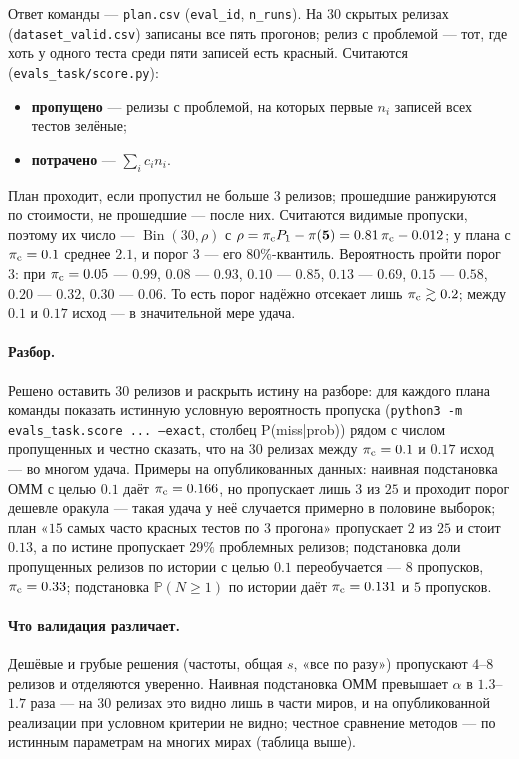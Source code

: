\documentclass[11pt,a4paper]{article}
\newcommand{\Prob}{\mathbb{P}}
\newcommand{\Bin}{\operatorname{Bin}}
\theoremstyle{plain}
\theoremstyle{definition}
\begin{document}
Ответ команды --- \texttt{plan.csv} (\texttt{eval\_id}, \texttt{n\_runs}). На $30$ скрытых релизах (\texttt{dataset\_valid.csv}) записаны все пять прогонов; релиз с проблемой --- тот, где хоть у одного теста среди пяти записей есть красный. Считаются (\texttt{evals\_task/score.py}):
\begin{itemize}
\item \textbf{пропущено} --- релизы с проблемой, на которых первые $n_i$ записей всех тестов зелёные;
\item \textbf{потрачено} --- $\sum_ic_in_i$.
\end{itemize}
План проходит, если пропустил не больше $3$ релизов; прошедшие ранжируются по стоимости, не прошедшие --- после них. Считаются видимые пропуски, поэтому их число --- $\Bin(30,\rho)$ с $\rho=\pi_{\rm c}P_1-\pi(\mathbf5)=0.81\,\pi_{\rm c}-0.012$; у плана с $\pi_{\rm c}=0.1$ среднее $2.1$, и порог $3$ --- его $80\%$-квантиль. Вероятность пройти порог $3$: при $\pi_{\rm c}=0.05$ --- $0.99$, $0.08$ --- $0.93$, $0.10$ --- $0.85$, $0.13$ --- $0.69$, $0.15$ --- $0.58$, $0.20$ --- $0.32$, $0.30$ --- $0.06$. То есть порог надёжно отсекает лишь $\pi_{\rm c}\gtrsim0.2$; между $0.1$ и $0.17$ исход --- в значительной мере удача.

\paragraph{Разбор.} Решено оставить $30$ релизов и раскрыть истину на разборе: для каждого плана команды показать истинную условную вероятность пропуска (\texttt{python3 -m evals\_task.score ... --exact}, столбец P(miss|prob)) рядом с числом пропущенных и честно сказать, что на $30$ релизах между $\pi_{\rm c}=0.1$ и $0.17$ исход --- во многом удача. Примеры на опубликованных данных: наивная подстановка ОММ с целью $0.1$ даёт $\pi_{\rm c}=0.166$, но пропускает лишь $3$ из $25$ и проходит порог дешевле оракула --- такая удача у неё случается примерно в половине выборок; план «$15$ самых часто красных тестов по $3$ прогона» пропускает $2$ из $25$ и стоит $0.13$, а по истине пропускает $29\%$ проблемных релизов; подстановка доли пропущенных релизов по истории с целью $0.1$ переобучается --- $8$ пропусков, $\pi_{\rm c}=0.33$; подстановка $\Prob(N\ge1)$ по истории даёт $\pi_{\rm c}=0.131$ и $5$ пропусков.

\paragraph{Что валидация различает.} Дешёвые и грубые решения (частоты, общая $s$, «все по разу») пропускают $4$--$8$ релизов и отделяются уверенно. Наивная подстановка ОММ превышает $\alpha$ в $1.3$--$1.7$ раза --- на $30$ релизах это видно лишь в части миров, и на опубликованной реализации при условном критерии не видно; честное сравнение методов --- по истинным параметрам на многих мирах (таблица выше).
\end{document}
